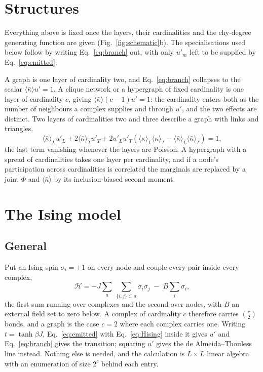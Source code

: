 \documentclass[aps,pre,twocolumn,superscriptaddress,floatfix]{revtex4-2}
\newcommand{\ave}[1]{\langle #1 \rangle}
\newcommand{\kbar}{\bar\kappa}
\begin{document}
\section{Structures}
\label{sec:structures}

Everything above is fixed once the layers, their cardinalities and the
chy-degree generating function are given (Fig.~\ref{fig:schematic}b). The
specialisations used below follow by writing Eq.~\eqref{eq:branch} out, with
only $u'_m$ left to be supplied by Eq.~\eqref{eq:emitted}.

A graph is one layer of cardinality two, and Eq.~\eqref{eq:branch} collapses to
the scalar $\ave{\kbar}u'=1$. A clique network or a hypergraph of fixed
cardinality is one layer of cardinality $c$, giving $\ave{\kbar}(c-1)u'=1$: the
cardinality enters both as the number of neighbours a complex supplies and
through $u'$, and the two effects are distinct. Two layers of cardinalities two
and three describe a graph with links and triangles,
\begin{equation}
  \ave{\kbar}_L u'_L+2\ave{\kbar}_T u'_T
  +2u'_Lu'_T\!\left(\ave{\kappa}_L\ave{\kappa}_T
                    -\ave{\kbar}_L\ave{\kbar}_T\right)=1,
  \label{eq:LT}
\end{equation}
the last term vanishing whenever the layers are Poisson. A hypergraph with a
spread of cardinalities takes one layer per cardinality, and if a node's
participation across cardinalities is correlated the marginals are replaced by a
joint $\Phi$ and $\ave{\kbar}$ by its inclusion-biased second moment.

\section{The Ising model}
\label{sec:ising}

\subsection{General}

Put an Ising spin $\sigma_i=\pm1$ on every node and couple every pair inside
every complex,
\begin{equation}
  \mathcal{H}=-J\sum_{a}\ \sum_{\{i,j\}\subset a}\sigma_i\sigma_j
              \;-\;B\sum_i\sigma_i,
  \label{eq:Hising}
\end{equation}
the first sum running over complexes and the second over nodes, with $B$ an
external field set to zero below. A complex of cardinality $c$ therefore carries
$\binom{c}{2}$ bonds, and a graph is the case $c=2$ where each complex carries
one. Writing $t=\tanh\beta J$, Eq.~\eqref{eq:emitted} with
Eq.~\eqref{eq:Hising} inside it gives $u'$ and Eq.~\eqref{eq:branch} gives the
transition; squaring $u'$ gives the de Almeida--Thouless line instead. Nothing else is needed, and the calculation is
$L\times L$ linear algebra with an enumeration of size $2^{c}$ behind each entry.
\end{document}
